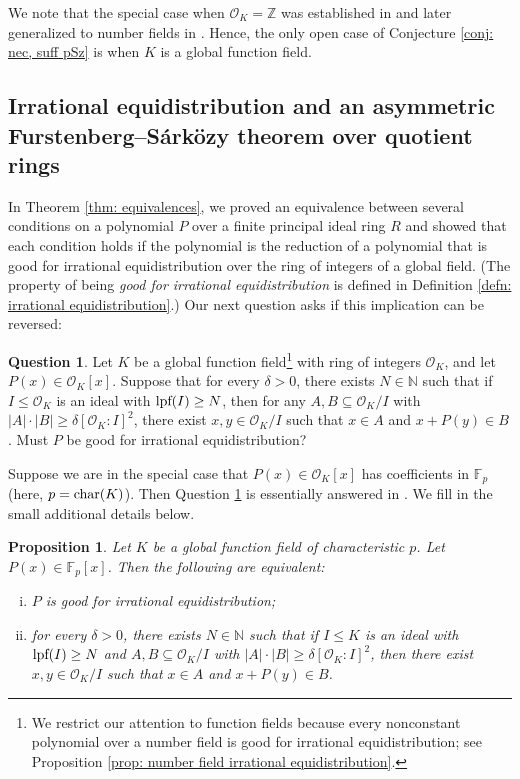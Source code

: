 \documentclass{amsart}
\newtheorem{proposition}[theorem]{Proposition}
\theoremstyle{definition}
\newtheorem{question}[theorem]{Question}
\numberwithin{equation}{section}
\newcommand{\N}{\mathbb{N}}
\newcommand{\Z}{\mathbb{Z}}
\newcommand{\F}{\mathbb{F}}
\newcommand{\mO}{\mathcal{O}}
\newcommand{\lpf}{\normalfont\text{lpf}}
\renewcommand{\char}{\textup{char}}
\begin{document}
We note that the special case when $\mO_K = \Z$ was established in \cite{bll} and later generalized to number fields in \cite{br}.
Hence, the only open case of Conjecture \ref{conj: nec, suff pSz} is when $K$ is a global function field.


\subsection{Irrational equidistribution and an asymmetric Furstenberg--S\'{a}rk\"{o}zy theorem over quotient rings} \label{sec: A,B equidistribution}

In Theorem \ref{thm: equivalences}, we proved an equivalence between several conditions on a polynomial $P$ over a finite principal ideal ring $R$ and showed that each condition holds if the polynomial is the reduction of a polynomial that is good for irrational equidistribution over the ring of integers of a global field.
(The property of being \emph{good for irrational equidistribution} is defined in Definition \ref{defn: irrational equidistribution}.)
Our next question asks if this implication can be reversed:

\begin{question} \label{quest: A,B equidistribution}
    Let $K$ be a global function field\footnote{We restrict our attention to function fields because every nonconstant polynomial over a number field is good for irrational equidistribution; see Proposition \ref{prop: number field irrational equidistribution}.} with ring of integers $\mO_K$, and let $P(x) \in \mO_K[x]$.
    Suppose that for every $\delta > 0$, there exists $N \in \N$ such that if $I \le \mO_K$ is an ideal with $\lpf(I) \ge N$, then for any $A, B \subseteq \mO_K/I$ with $|A|\cdot |B| \ge \delta [\mO_K:I]^2$, there exist $x,y \in \mO_K/I$ such that $x \in A$ and $x + P(y) \in B$.
    Must $P$ be good for irrational equidistribution?
\end{question}

Suppose we are in the special case that $P(x) \in \mO_K[x]$ has coefficients in $\F_p$ (here, $p = \char(K)$).
Then Question \ref{quest: A,B equidistribution} is essentially answered in \cite[Theorem 1.17]{ab_Sarkozy}.
We fill in the small additional details below.

\begin{proposition} \label{prop: A,B equidistribution F_p}
    Let $K$ be a global function field of characteristic $p$.
    Let $P(x) \in \F_p[x]$.
    Then the following are equivalent:
    \begin{enumerate}[(i)]
        \item $P$ is good for irrational equidistribution;
        \item for every $\delta > 0$, there exists $N \in \N$ such that if $I \le K$ is an ideal with $\lpf(I) \ge N$ and $A, B \subseteq \mO_K/I$ with $|A|\cdot|B| \ge \delta [\mO_K:I]^2$, then there exist $x,y \in \mO_K/I$ such that $x \in A$ and $x+P(y) \in B$.
    \end{enumerate}
\end{proposition}
\end{document}
